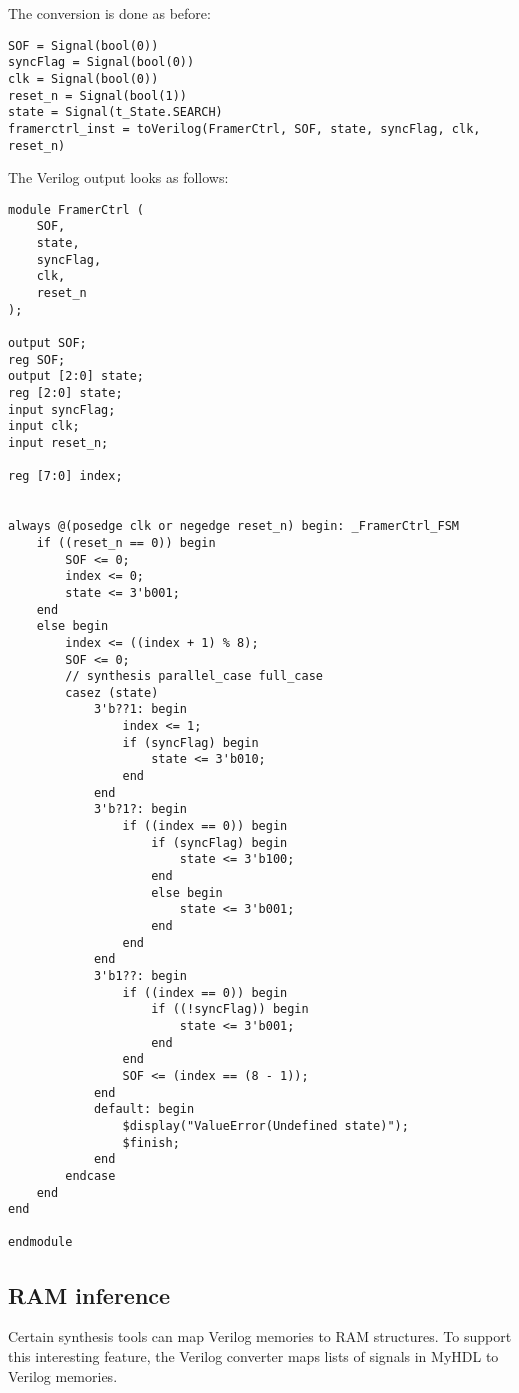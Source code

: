 The conversion is done as before:

\begin{verbatim}
SOF = Signal(bool(0))
syncFlag = Signal(bool(0))
clk = Signal(bool(0))
reset_n = Signal(bool(1))
state = Signal(t_State.SEARCH)
framerctrl_inst = toVerilog(FramerCtrl, SOF, state, syncFlag, clk, reset_n)
\end{verbatim}

The Verilog output looks as follows:

\begin{verbatim}
module FramerCtrl (
    SOF,
    state,
    syncFlag,
    clk,
    reset_n
);

output SOF;
reg SOF;
output [2:0] state;
reg [2:0] state;
input syncFlag;
input clk;
input reset_n;

reg [7:0] index;


always @(posedge clk or negedge reset_n) begin: _FramerCtrl_FSM
    if ((reset_n == 0)) begin
        SOF <= 0;
        index <= 0;
        state <= 3'b001;
    end
    else begin
        index <= ((index + 1) % 8);
        SOF <= 0;
        // synthesis parallel_case full_case
        casez (state)
            3'b??1: begin
                index <= 1;
                if (syncFlag) begin
                    state <= 3'b010;
                end
            end
            3'b?1?: begin
                if ((index == 0)) begin
                    if (syncFlag) begin
                        state <= 3'b100;
                    end
                    else begin
                        state <= 3'b001;
                    end
                end
            end
            3'b1??: begin
                if ((index == 0)) begin
                    if ((!syncFlag)) begin
                        state <= 3'b001;
                    end
                end
                SOF <= (index == (8 - 1));
            end
            default: begin
                $display("ValueError(Undefined state)");
                $finish;
            end
        endcase
    end
end

endmodule
\end{verbatim}

\subsection{RAM inference \label{conf-usage-RAM}}

Certain synthesis tools can map Verilog memories to RAM
structures. To support this interesting feature, the Verilog converter
maps lists of signals in MyHDL to Verilog memories.

